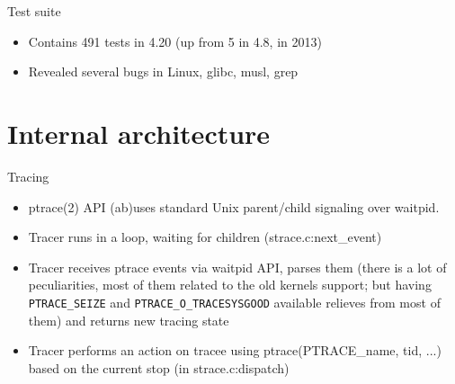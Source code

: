 \documentclass[unicode,aspectratio=169]{beamer}
\begin{document}
\begin{frame}{Test suite}
	\begin{itemize}
		\item Contains 491 tests in 4.20 (up from 5 in 4.8, in 2013)
		\item Revealed several bugs in Linux, glibc, musl, grep
	\end{itemize}
\end{frame}


\section{Internal architecture}

\begin{frame}{Tracing}
\begin{itemize}
	\item ptrace(2) API (ab)uses standard Unix parent/child signaling over waitpid.
	\item Tracer runs in a loop, waiting for children (strace.c:next\_event)
	\item Tracer receives ptrace events via waitpid API, parses them (there is a lot of peculiarities, most of them related to the old kernels support; but having \texttt{PTRACE\_SEIZE} and \texttt{PTRACE\_O\_TRACESYSGOOD} available relieves from most of them) and returns new tracing state
	\item Tracer performs an action on tracee using ptrace(PTRACE\_name, tid, ...) based on the current stop (in strace.c:dispatch)
\end{itemize}
\end{frame}
\end{document}
